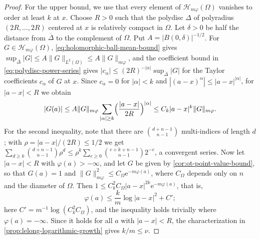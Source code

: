 \begin{proof}
For the upper bound, we use that every element of $\mathcal H_{m\varphi}(\Omega)$ vanishes to order at least $k$ at $x$. Choose $R>0$ such that the polydisc $\Delta$ of polyradius $(2R,\ldots,2R)$ centered at $x$ is relatively compact in $\Omega$. Let $\delta>0$ be half the distance from $\overline\Delta$ to the complement of $\Omega$. Put $A=|B(0,\delta)|^{-1/2}$. For $G\in\mathcal H_{m\varphi}(\Omega)$, \eqref{eq:holomorphic-ball-mean-bound} gives $\sup_{\overline\Delta}|G|\leq A\|G\|_{L^2(\Omega)}\leq A\|G\|_{m\varphi}$, and the coefficient bound in \eqref{eq:polydisc-power-series} gives $|c_\alpha|\leq(2R)^{-|\alpha|}\sup_{\overline\Delta}|G|$ for the Taylor coefficients $c_\alpha$ of $G$ at $x$. Since $c_\alpha=0$ for $|\alpha|<k$ and $|(a-x)^\alpha|\leq|a-x|^{|\alpha|}$, for $|a-x|<R$ we obtain
\[
 |G(a)|\leq A\|G\|_{m\varphi}\sum_{|\alpha|\geq k}\Bigl(\frac{|a-x|}{2R}\Bigr)^{|\alpha|}
 \leq C_k|a-x|^k\|G\|_{m\varphi}.
\]
For the second inequality, note that there are $\binom{d+n-1}{n-1}$ multi-indices of length $d$; with $\rho=|a-x|/(2R)\leq1/2$ we get $\sum_{d\geq k}\binom{d+n-1}{n-1}\rho^d\leq\rho^k\sum_{e\geq0}\binom{e+k+n-1}{n-1}2^{-e}$, a convergent series. Now let $|a-x|<R$ with $\varphi(a)>-\infty$, and let $G$ be given by \cref{cor:ot-point-value-bound}, so that $G(a)=1$ and $\|G\|_{m\varphi}^2\leq C_\Omega\mathrm e^{-m\varphi(a)}$, where $C_\Omega$ depends only on $n$ and the diameter of $\Omega$. Then $1\leq C_k^2C_\Omega|a-x|^{2k}\mathrm e^{-m\varphi(a)}$, that is,
\[
 \varphi(a)\leq\frac km\log|a-x|^2+C';
\]
here $C'=m^{-1}\log(C_k^2C_\Omega)$, and the inequality holds trivially where $\varphi(a)=-\infty$. Since it holds for all $a$ with $|a-x|<R$, the characterization in \cref{prop:lelong-logarithmic-growth} gives $k/m\leq\nu$.
\end{proof}

